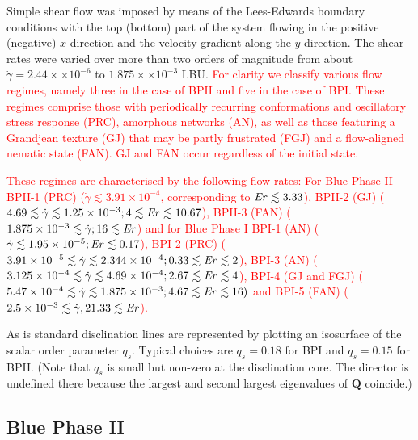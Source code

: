 \documentclass[8.5pt,twoside,twocolumn]{article}
\newcommand{\e}[1]{\times10^{#1}}
\newcommand{\gd}{\dot{\gamma}}
\newcommand{\rev}[1]{{\textcolor{red}{#1}}}
\begin{document}
Simple shear flow was imposed by means of the Lees-Edwards boundary
conditions with
the top (bottom) part of the system flowing in the positive (negative) $x$-direction and the 
velocity gradient along the $y$-direction.
The shear rates were varied over more than two orders of magnitude from about 
$\gd=2.44\times \e{-6}$ to $1.875\times\e{-3}$ LBU.
\rev{
For clarity we classify various flow regimes, namely three in the case of BPII and five in the 
case of BPI. These regimes comprise those with periodically recurring conformations and oscillatory stress response (PRC), 
amorphous networks (AN), as well as those featuring a Grandjean texture (GJ) that
may be partly frustrated (FGJ) and a flow-aligned nematic state (FAN). 
GJ and FAN occur regardless of the initial state.
} 

\rev{
These regimes are characterised by the following flow rates: 
For Blue Phase II BPII-1 (PRC) ($\gd \lesssim 3.91\e{-4}$, corresponding to ${\it Er} \lesssim 3.33$), 
BPII-2 (GJ) ($4.69\lesssim \gd\lesssim 1.25\e{-3}; 4\lesssim {\it Er} \lesssim 10.67$), 
BPII-3 (FAN) ($1.875\e{-3}\lesssim \gd; 16 \lesssim {\it Er}$) 
and for Blue Phase I BPI-1 (AN) ($\gd \lesssim 1.95\e{-5}; {\it Er} \lesssim 0.17$),  
BPI-2 (PRC) ($3.91\e{-5}\lesssim \gd \lesssim 2.344\e{-4}; 0.33\lesssim {\it Er} \lesssim 2$),
BPI-3 (AN) ($3.125\e{-4}\lesssim \gd\lesssim 4.69\e{-4}; 2.67 \lesssim {\it Er} \lesssim 4$),
BPI-4 (GJ and FGJ) ($5.47\e{-4} \lesssim \gd \lesssim 1.875\e{-3}; 4.67\lesssim {\it Er} \lesssim 16)$ and
BPI-5 (FAN) ($2.5\e{-3}\lesssim \gd, 21.33\lesssim {\it Er}$).
}

As is standard \cite{Henrich:2010b,Henrich:2012b} disclination lines are represented by plotting an isosurface of the scalar order parameter $q_s$. 
Typical choices are $q_s=0.18$ for BPI and $q_s=0.15$ for BPII.
(Note that $q_s$ is small but non-zero at the disclination core. The director is undefined there because the largest and second largest eigenvalues of ${\mathbf Q}$ coincide.)

\subsection{Blue Phase II}
\end{document}
